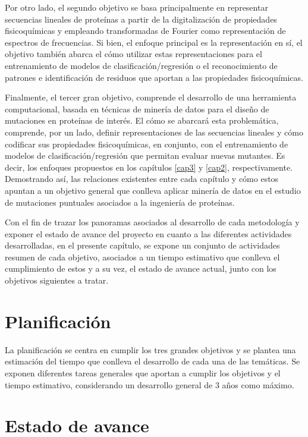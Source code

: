 Por otro lado, el segundo objetivo se basa principalmente en representar secuencias lineales de proteínas a partir de la digitalización de propiedades fisicoquímicas y empleando transformadas de Fourier como representación de espectros de frecuencias. Si bien, el enfoque principal es la representación en sí, el objetivo también abarca el cómo utilizar estas representaciones para el entrenamiento de modelos de clasificación/regresión o el reconocimiento de patrones e identificación de residuos que aportan a las propiedades fisicoquímicas.

Finalmente, el tercer gran objetivo, comprende el desarrollo de una herramienta computacional, basada en técnicas de minería de datos para el diseño de mutaciones en proteínas de interés. El cómo se abarcará esta problemática, comprende, por un lado, definir representaciones de las secuencias lineales y cómo codificar sus propiedades fisicoquímicas, en conjunto, con el entrenamiento de modelos de clasificación/regresión que permitan evaluar nuevas mutantes. Es decir, los enfoques propuestos en los capítulos \ref{cap3} y \ref{cap2}, respectivamente. Demostrando así, las relaciones existentes entre cada capítulo y cómo estos apuntan a un objetivo general que conlleva aplicar minería de datos en el estudio de mutaciones puntuales asociados a la ingeniería de proteínas.

Con el fin de trazar los panoramas asociados al desarrollo de cada metodología y exponer el estado de avance del proyecto en cuanto a las diferentes actividades desarrolladas, en el presente capítulo, se expone un conjunto de actividades resumen de cada objetivo, asociados a un tiempo estimativo que conlleva el cumplimiento de estos y a su vez, el estado de avance actual, junto con los objetivos siguientes a tratar.

\section{Planificación}

La planificación se centra en cumplir los tres grandes objetivos y se plantea una estimación del tiempo que conlleva el desarrollo de cada una de las temáticas. Se exponen diferentes tareas generales que aportan a cumplir los objetivos y el tiempo estimativo, considerando un desarrollo general de 3 años como máximo.

\section{Estado de avance}




